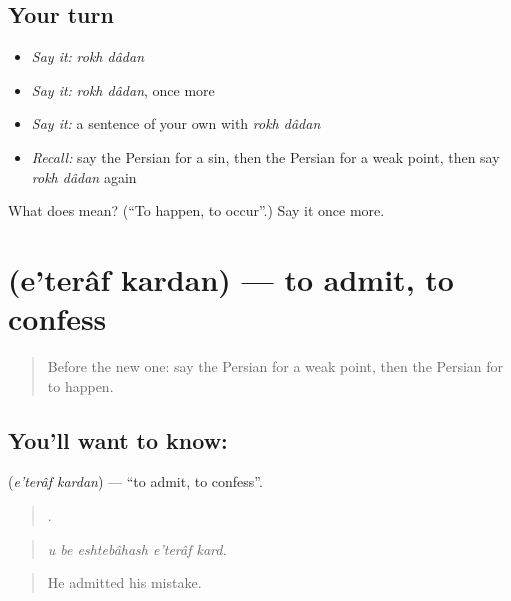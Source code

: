 \subsection*{Your turn}
\begin{itemize}
\raggedright
  \item \emph{Say it:} \emph{rokh dâdan}
  \item \emph{Say it:} \emph{rokh dâdan}, once more
  \item \emph{Say it:} a sentence of your own with \emph{rokh dâdan}
  \item \emph{Recall:} say the Persian for a sin, then the Persian for a weak point, then say \emph{rokh dâdan} again
\end{itemize}

\begin{tcolorbox}[breakable,colback=teal!4,colframe=teal!35!black,title={Before you move on}]
What does   mean? (\textquotedblleft{}To happen, to occur\textquotedblright{}.) Say it once more.
\end{tcolorbox}
\section[\texorpdfstring{\fa{اعتراف} \fa{کردن} (e'terâf kardan)}{اعتراف کردن (e'terâf kardan)}]{  (e'terâf kardan) — to admit, to confess}

\label{lesson:FA-C376-eteraf-kardan}



\begin{quote}
Before the new one: say the Persian for a weak point, then the Persian for to happen.
\end{quote}

\subsection*{You'll want to know:  }
\textbf{ } (\emph{e'terâf kardan}) — \textquotedblleft{}to admit, to confess\textquotedblright{}.

\begin{quote}
    .
\end{quote}

\begin{quote}
\emph{u be eshtebâhash e'terâf kard.}
\end{quote}

\begin{quote}
He admitted his mistake.
\end{quote}

